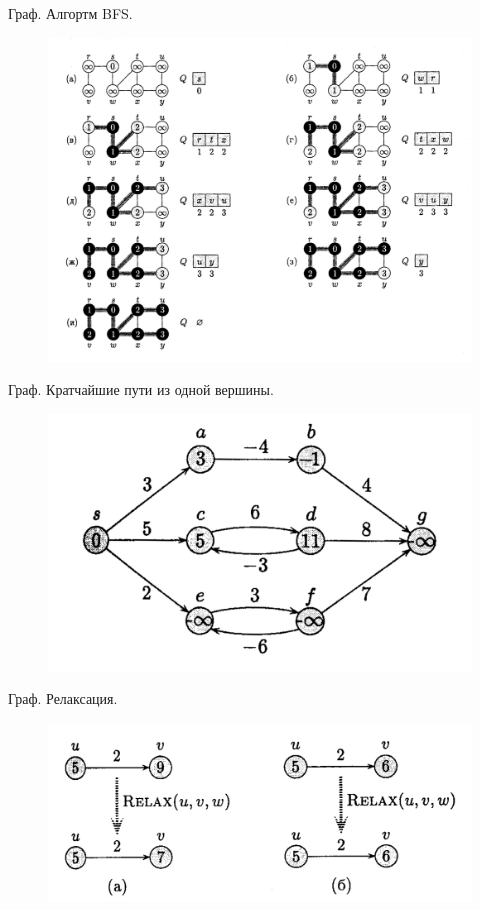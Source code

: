 \documentclass[newPxFont]{beamer}
\begin{document}
\begin{frame}{Граф. Алгортм BFS.}
\begin{figure}
\centerline{\includegraphics[width=1.0\linewidth]{images/bfs_graph.png}}
\end{figure}
\end{frame}




\begin{frame}{Граф. Кратчайшие пути из одной вершины.}
\begin{figure}
\centerline{\includegraphics[width=1.0\linewidth]{images/closest1.png}}
\end{figure}
\end{frame}

\begin{frame}{Граф. Релаксация.}
\begin{figure}
\centerline{\includegraphics[width=1.0\linewidth]{images/relax.png}}
\end{figure}
\end{frame}
\end{document}
